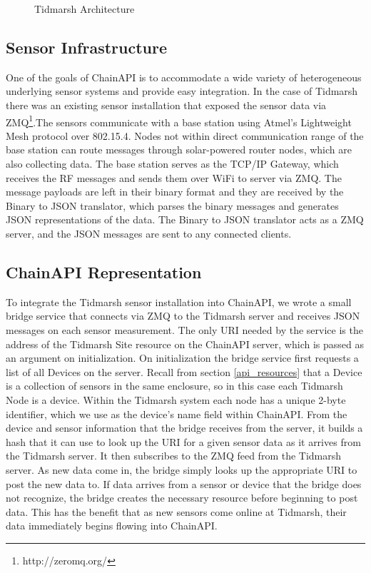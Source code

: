 \documentclass{acm_proc_article-sp}
\begin{document}
\begin{figure}
    \centering
    
    \caption{Tidmarsh Architecture}
    \label{tidmarsh_arch}
\end{figure}

\subsection{Sensor Infrastructure}

One of the goals of ChainAPI is to accommodate a wide variety of heterogeneous
underlying sensor systems and provide easy integration. In the case of Tidmarsh
there was an existing sensor installation that exposed the sensor data via
ZMQ\footnote{http://zeromq.org/}.The sensors communicate with a base station
using Atmel's Lightweight Mesh protocol over 802.15.4. Nodes not within direct
communication range of the base station can route messages through
solar-powered router nodes, which are also collecting data. The base station
serves as the TCP/IP Gateway, which receives the RF messages and sends them
over WiFi to server via ZMQ. The message payloads are left in their binary
format and they are received by the Binary to JSON translator, which parses the
binary messages and generates JSON representations of the data. The Binary to
JSON translator acts as a ZMQ server, and the JSON messages are sent to any
connected clients.

\subsection{ChainAPI Representation}

To integrate the Tidmarsh sensor installation into ChainAPI, we wrote a small
bridge service that connects via ZMQ to the Tidmarsh server and receives JSON
messages on each sensor measurement. The only URI needed by the service
is the address of the Tidmarsh Site resource on the ChainAPI server, which is
passed as an argument on initialization. On initialization the bridge service
first requests a list of all Devices on the server. Recall from section
\ref{api_resources} that a Device is a collection of sensors in the same
enclosure, so in this case each Tidmarsh Node is a device. Within the Tidmarsh
system each node has a unique 2-byte identifier, which we use as the device's
name field within ChainAPI. From the device and sensor information that the
bridge receives from the server, it builds a hash that it can use to look up
the URI for a given sensor data as it arrives from the Tidmarsh server. It then
subscribes to the ZMQ feed from the Tidmarsh server. As new data come in, the
bridge simply looks up the appropriate URI to post the new data to. If data
arrives from a sensor or device that the bridge does not recognize, the bridge
creates the necessary resource before beginning to post data. This has the
benefit that as new sensors come online at Tidmarsh, their data immediately
begins flowing into ChainAPI.
\end{document}
